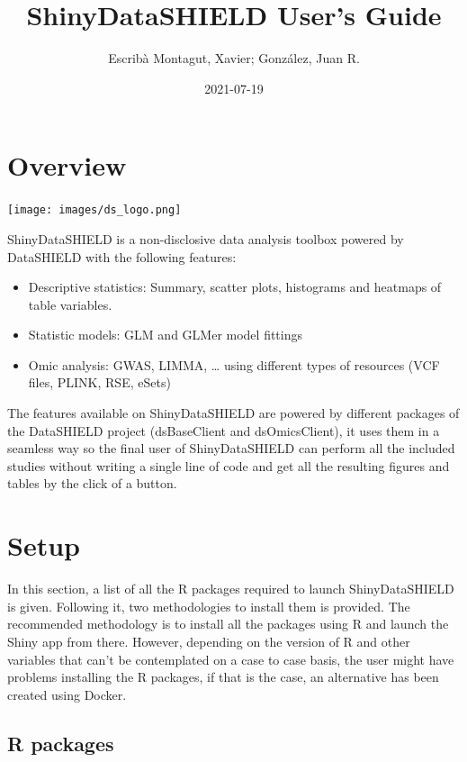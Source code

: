 \documentclass[
]{book}
\title{ShinyDataSHIELD User's Guide}
\author{Escribà Montagut, Xavier; González, Juan R.}
\date{2021-07-19}
\providecommand{\tightlist}{%
  \setlength{\itemsep}{0pt}\setlength{\parskip}{0pt}}
\begin{document}
\maketitle

{
\setcounter{tocdepth}{1}
\tableofcontents
}
\hypertarget{overview}{%
\chapter{Overview}\label{overview}}

\texttt{[image: images/ds\_logo.png]}

ShinyDataSHIELD is a non-disclosive data analysis toolbox powered by DataSHIELD with the following features:

\begin{itemize}
\tightlist
\item
  Descriptive statistics: Summary, scatter plots, histograms and heatmaps of table variables.
\item
  Statistic models: GLM and GLMer model fittings
\item
  Omic analysis: GWAS, LIMMA, \ldots{} using different types of resources (VCF files, PLINK, RSE, eSets)
\end{itemize}

The features available on ShinyDataSHIELD are powered by different packages of the DataSHIELD project (dsBaseClient and dsOmicsClient), it uses them in a seamless way so the final user of ShinyDataSHIELD can perform all the included studies without writing a single line of code and get all the resulting figures and tables by the click of a button.

\hypertarget{setup}{%
\chapter{Setup}\label{setup}}

In this section, a list of all the R packages required to launch ShinyDataSHIELD is given. Following it, two methodologies to install them is provided. The recommended methodology is to install all the packages using R and launch the Shiny app from there. However, depending on the version of R and other variables that can't be contemplated on a case to case basis, the user might have problems installing the R packages, if that is the case, an alternative has been created using Docker.

\hypertarget{r-packages}{%
\section{R packages}\label{r-packages}}
\end{document}
